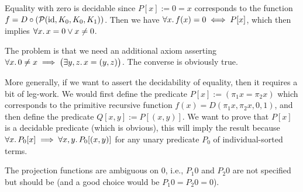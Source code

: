 \begin{node}
Equality with zero is decidable since $P[x]:=0=x$ corresponds to
the function $f = D\circ(\mathcal{P}(\operatorname{id}, K_{0}, K_{0}, K_{1}))$. Then we have 
$\forall x\ldotp f(x)=0\iff P[x]$, which then implies $\forall x\ldotp x=0\lor x\neq0$.

The problem is that we need an additional axiom asserting
$\forall x\ldotp 0\neq x\implies\bigl(\exists y,z\ldotp x=(y,z)\bigr)$.
The converse is obviously true.
\end{node}

\begin{node}
More generally, if we want to assert the decidability of equality,
then it requires a bit of leg-work. We would first define the
predicate $P[x]:=(\pi_{1}x=\pi_{2}x)$ which corresponds to the
primitive recursive function $f(x)=D(\pi_{1}x,\pi_{2}x,0,1)$,
and then define the predicate $Q[x,y]:=P[(x,y)]$. We want to prove
that $P[x]$ is a decidable predicate (which is obvious), this will
imply the result because $\forall x\ldotp P_{0}[x]\implies\forall x,y\ldotp P_{0}[(x,y)]$ for
any unary predicate $P_{0}$ of individual-sorted terms. 
\end{node}

\begin{problem}[Minor]
The projection functions are ambiguous on $0$, i.e., $P_{1}0$ and
$P_{2}0$ are not specified but should be (and a good choice would be
$P_{1}0=P_{2}0=0$). 
\end{problem}

\nwenddocs{}

